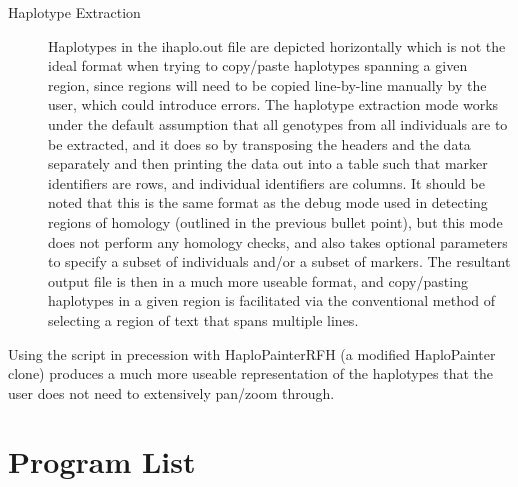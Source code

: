 \begin{description}
\item[Haplotype Extraction]{Haplotypes in the ihaplo.out file are depicted horizontally which is not the ideal format when trying to copy/paste haplotypes spanning a given region, since regions will need to be copied line-by-line manually by the user, which could introduce errors. The haplotype extraction mode works under the default assumption that all genotypes from all individuals are to be extracted, and it does so by transposing the headers and the data separately and then printing the data out into a table such that marker identifiers are rows, and individual identifiers are columns. It should be noted that this is the same format as the debug mode used in detecting regions of homology (outlined in the previous bullet point), but this mode does not perform any homology checks, and also takes optional parameters to specify a subset of individuals and/or a subset of markers. The resultant output file is then in a much more useable format, and copy/pasting haplotypes in a given region is facilitated via the conventional method of selecting a region of text that spans multiple lines.}
\end{description}

Using the script in precession with \gls{HaploPainterRFH} (a modified HaploPainter clone) produces a much more useable representation of the haplotypes that the user does not need to extensively pan/zoom through. 



\section{Program List}
\label{ref:meth:proglist}